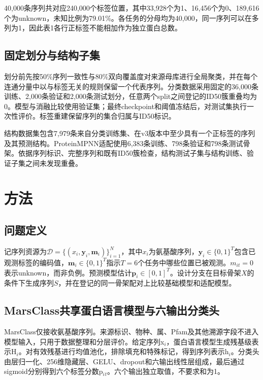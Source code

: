 \documentclass[conference]{IEEEtran}
\begin{document}
40,000条序列共对应240,000个标签位置，其中33,928个为1、16,456个为0、189,616个为unknown，未知比例为79.01\%。各任务的分母均为40,000，同一序列可以在多列为1，因此表1各行正标签不能相加作为独立蛋白总数。

\subsection{固定划分与结构子集}

划分前先按50\%序列一致性与80\%双向覆盖度对来源母库进行全局聚类，并在每个连通分量中以与标签无关的规则保留一个代表序列。分类数据采用固定的36,000条训练、2,000条验证和2,000条测试划分，任意两个split之间登记的ID50簇重叠均为0。模型与消融比较使用验证集；最终checkpoint和阈值冻结后，对测试集执行一次性评价。标签重建保留序列的集合归属与ID50标识。

结构数据集包含7,979条来自分类训练集、在v3版本中至少具有一个正标签的序列及其预测结构。ProteinMPNN适配使用6,383条训练、798条验证和798条测试骨架。依据序列标识、完整序列和既有ID50簇检查，结构测试子集与结构训练、验证子集之间未发现重叠。

\section{方法}\label{sec:method}

\subsection{问题定义}

记序列资源为$\mathcal{D}=\{(x_i,\mathbf{y}_i,\mathbf{m}_i)\}_{i=1}^{N}$，其中$x_i$为氨基酸序列，$\mathbf{y}_i\in\{0,1\}^{T}$包含已观测标签的编码值，$\mathbf{m}_i\in\{0,1\}^{T}$指示$T=6$个任务中哪些位置已被观测。$m_{it}=0$表示unknown，而非负例。预测模型估计$\mathbf{p}_i\in[0,1]^T$。设计分支在目标骨架$X$的条件下生成序列$S$，并在登记的同一骨架配对上比较基础模型和适配模型。

\subsection{MarsClass共享蛋白语言模型与六输出分类头}

MarsClass仅接收氨基酸序列。来源标识、物种、属、Pfam及其他溯源字段不进入模型输入，只用于数据整理和分层评价。给定序列x$_i$，蛋白语言模型生成残基级表示H$_i$。对有效残基进行均值池化，排除填充和特殊标记，得到序列表示h$_i$。分类头由层归一化、256维隐藏层、GELU、dropout和六输出线性层组成，最后通过sigmoid分别得到六个标签分数p$_i$$_t$。六个输出独立取值，不要求和为1。
\end{document}
